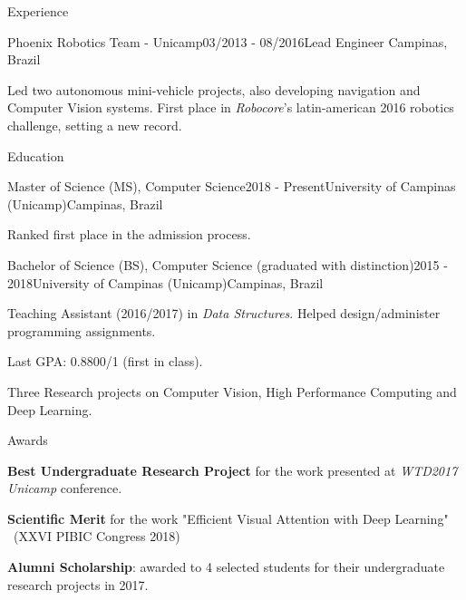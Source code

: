 \documentclass[8pt]{resume}
\newcommand{\tit}[1]{\textit{#1}}
\newcommand{\tbf}[1]{\textbf{#1}}
\begin{document}
\begin{rSection}{Experience}
\begin{rSubsection}{Phoenix Robotics Team - Unicamp}{03/2013 - 08/2016}{Lead Engineer}
    {Campinas, Brazil}
    \item Led two autonomous mini-vehicle projects, also developing navigation and Computer Vision systems.
        First place in \tit{Robocore}'s latin-american 2016 robotics
        challenge, setting a new record.
\end{rSubsection}

\end{rSection}

\begin{rSection}{Education}
\begin{rSubsection}{Master of Science (MS), Computer Science}{2018 - Present}{University of Campinas (Unicamp)}{Campinas, Brazil}
    \item Ranked first place in the admission process.
\end{rSubsection}

\begin{rSubsection}{Bachelor of Science (BS), Computer Science (graduated with distinction)}{2015 - 2018}{University of Campinas (Unicamp)}{Campinas, Brazil}
    \item Teaching Assistant (2016/2017) in \tit{Data Structures}. Helped
        design/administer programming assignments.
    \item Last GPA: 0.8800/1 (first in class).
    \item Three Research projects on Computer Vision, High Performance Computing and Deep Learning.
\end{rSubsection}
\end{rSection}

\begin{rSection}{Awards}
\begin{rSubsection}{}{}{}{}
    \vspace{-0.5em}
    \item \tbf{Best Undergraduate Research Project} for the work presented at \tit{WTD2017 Unicamp} conference.
    \item \tbf{Scientific Merit} for the work "Efficient Visual Attention with Deep Learning" ~(XXVI PIBIC Congress 2018)
    \item \tbf{Alumni Scholarship}: awarded to 4 selected students for their undergraduate research projects in 2017.
\end{rSubsection}
\end{rSection}
\end{document}
